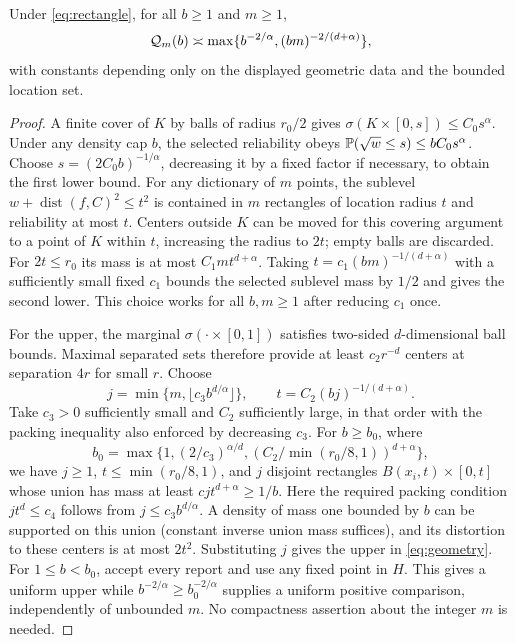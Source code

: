 \begin{proposition}\label{prop:geometry}
Under \eqref{eq:rectangle}, for all $b\ge1$ and $m\ge1$,
\begin{equation}\label{eq:geometry}
 \mathcal Q_m(b)\asymp
 \max\{b^{-2/\alpha},(bm)^{-2/(d+\alpha)}\},
\end{equation}
with constants depending only on the displayed geometric data and the bounded location set.
\end{proposition}
\begin{proof}
A finite cover of $K$ by balls of radius $r_0/2$ gives
$\sigma(K\times[0,s])\le C_0s^\alpha$. Under any density cap $b$, the selected reliability obeys
$\mathbb P(\sqrt w\le s)\le bC_0s^\alpha$. Choose $s=(2C_0b)^{-1/\alpha}$, decreasing it by a fixed factor if necessary, to obtain the first lower bound.
For any dictionary of $m$ points, the sublevel $w+\operatorname{dist}(f,C)^2\le t^2$ is contained in $m$ rectangles of location radius $t$ and reliability at most $t$. Centers outside $K$ can be moved for this covering argument to a point of $K$ within $t$, increasing the radius to $2t$; empty balls are discarded. For $2t\le r_0$ its mass is at most $C_1mt^{d+\alpha}$. Taking $t=c_1(bm)^{-1/(d+\alpha)}$ with a sufficiently small fixed $c_1$ bounds the selected sublevel mass by $1/2$ and gives the second lower. This choice works for all $b,m\ge1$ after reducing $c_1$ once.

For the upper, the marginal $\sigma(\cdot\times[0,1])$ satisfies two-sided $d$-dimensional ball bounds. Maximal separated sets therefore provide at least $c_2r^{-d}$ centers at separation $4r$ for small $r$. Choose
\[
 j=\min\{m,\lfloor c_3b^{d/\alpha}\rfloor\},\qquad
 t=C_2(bj)^{-1/(d+\alpha)}.
\]
Take $c_3>0$ sufficiently small and $C_2$ sufficiently large, in that order with the packing inequality also enforced by decreasing $c_3$. For $b\ge b_0$, where
\[
 b_0=\max\{1,(2/c_3)^{\alpha/d},
            (C_2/\min(r_0/8,1))^{d+\alpha}\},
\]
we have $j\ge1$, $t\le\min(r_0/8,1)$, and $j$ disjoint rectangles
$B(x_i,t)\times[0,t]$ whose union has mass at least
$cjt^{d+\alpha}\ge1/b$.
Here the required packing condition $jt^d\le c_4$ follows from
$j\le c_3b^{d/\alpha}$. A density of mass one bounded by $b$ can be supported on this union (constant inverse union mass suffices), and its distortion to these centers is at most $2t^2$. Substituting $j$ gives the upper in \eqref{eq:geometry}. For $1\le b<b_0$, accept every report and use any fixed point in $H$. This gives a uniform upper while $b^{-2/\alpha}\ge b_0^{-2/\alpha}$ supplies a uniform positive comparison, independently of unbounded $m$. No compactness assertion about the integer $m$ is needed.
\end{proof}

